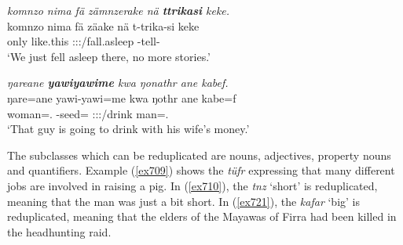 \begin{exe}
	\ex \emph{komnzo nima fä zämnzerake nä \textbf{ttrikasi} keke.}\\
	\gll komnzo nima fä zäake nä t-trika-si keke\\
	only {like.this} {\Dist} \Fnsg:\Sbj:\Pst:\Pfv/fall.asleep {\Indf} \Redup-tell-{\Nmlz} {\Neg}\\
	\trans `We just fell asleep there, no more stories.'
	\label{ex707}
\end{exe}
\begin{exe}
	\ex \emph{ŋareane \textbf{yawiyawime} kwa ŋonathr ane kabef.}\\
	\gll ŋare=ane yawi-yawi=me kwa ŋothr ane kabe=f\\
	woman=\Poss.{\Sg} \Redup-seed={\Ins} {\Fut} \Stsg:\Sbj:\Nonpast:\Ipfv/drink {\Dem} man=\Erg.{\Sg}\\
	\trans `That guy is going to drink with his wife's money.'
	\label{ex708}
\end{exe}

The  subclasses which can be reduplicated are nouns, adjectives, property nouns and quantifiers. Example (\ref{ex709}) shows the  \emph{tüfr} expressing that many different jobs are involved in raising a pig. In (\ref{ex710}), the  \emph{tnz} `short' is reduplicated, meaning that the man was just a bit short. In (\ref{ex721}), the  \emph{kafar} `big' is reduplicated, meaning that the elders of the Mayawas of Firra had been killed in the headhunting raid.

